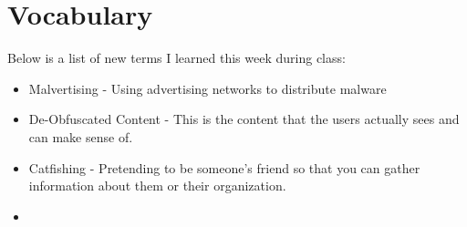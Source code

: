 \documentclass[letterpaper, onecolumn,10pt]{IEEEtran}
\begin{document}
                
                
            \section{Vocabulary}
            Below is a list of new terms I learned this week during class:
            \begin{itemize}
                \item Malvertising - Using advertising networks to distribute malware\\
                \item De-Obfuscated Content - This is the content that the users actually sees and can make sense of.\\
                \item Catfishing - Pretending to be someone's friend so that you can gather information about them or their organization.\\
                \item 
            \end{itemize}
                
		
\end{document}
